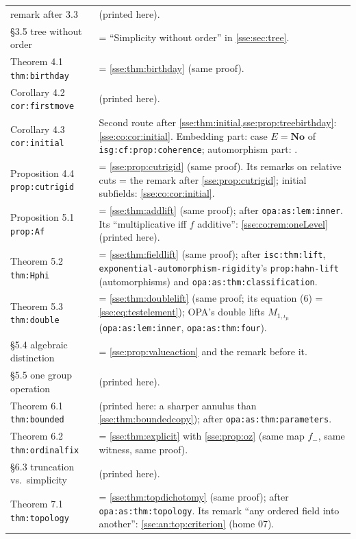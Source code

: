 \documentclass[11pt,a4paper]{article}
\numberwithin{equation}{section}
\theoremstyle{plain}
\theoremstyle{definition}
\theoremstyle{remark}
\newcommand{\No}{\mathbf{No}}
\newcommand{\lbl}[1]{\nolinkurl{#1}}%
\newcommand{\fn}[1]{\nolinkurl{#1}}%
\begin{document}
\begin{longtable}{P{34mm}P{116mm}}
remark after 3.3 &  (printed here). \\
\S3.5 tree without order & = ``Simplicity without order'' in \cref{sse:sec:tree}. \\
Theorem 4.1 \fn{thm:birthday} & = \cref{sse:thm:birthday} (same proof). \\
Corollary 4.2 \fn{cor:firstmove} &  (printed here). \\
Corollary 4.3 \fn{cor:initial} & Second route after \cref{sse:thm:initial,sse:prop:treebirthday}: \cref{sse:co:cor:initial}. Embedding part: case $E=\No$ of \lbl{isg:cf:prop:coherence}; automorphism part: \cite[Proposition~5.1]{KKS}. \\
Proposition 4.4 \fn{prop:cutrigid} & = \cref{sse:prop:cutrigid} (same proof). Its remarks on relative cuts = the remark after \cref{sse:prop:cutrigid}; initial subfields: \cref{sse:co:cor:initial}. \\
Proposition 5.1 \fn{prop:Af} & = \cref{sse:thm:addlift} (same proof); after \lbl{opa:as:lem:inner}. Its ``multiplicative iff $f$ additive'': \cref{sse:co:rem:oneLevel} (printed here). \\
Theorem 5.2 \fn{thm:Hphi} & = \cref{sse:thm:fieldlift} (same proof); after \lbl{isc:thm:lift}, \fn{exponential-automorphism-rigidity}'s \lbl{prop:hahn-lift} (automorphisms) and \lbl{opa:as:thm:classification}. \\
Theorem 5.3 \fn{thm:double} & = \cref{sse:thm:doublelift} (same proof; its equation (6) = \eqref{sse:eq:testelement}); OPA's double lifts $M_{1,\iota_\mu}$ (\lbl{opa:as:lem:inner}, \lbl{opa:as:thm:four}). \\
\S5.4 algebraic distinction & = \cref{sse:prop:valueaction} and the remark before it. \\
\S5.5 one group operation &  (printed here). \\
Theorem 6.1 \fn{thm:bounded} &  (printed here: a sharper annulus than \cref{sse:thm:boundedcopy}); after \lbl{opa:as:thm:parameters}. \\
Theorem 6.2 \fn{thm:ordinalfix} & = \cref{sse:thm:explicit} with \cref{sse:prop:oz} (same map $f_-$, same witness, same proof). \\
\S6.3 truncation vs.\ simplicity &  (printed here). \\
Theorem 7.1 \fn{thm:topology} & = \cref{sse:thm:topdichotomy} (same proof); after \lbl{opa:as:thm:topology}. Its remark ``any ordered field into another'': \cref{sse:an:top:criterion} (home 07). \\

\end{longtable}
\end{document}
